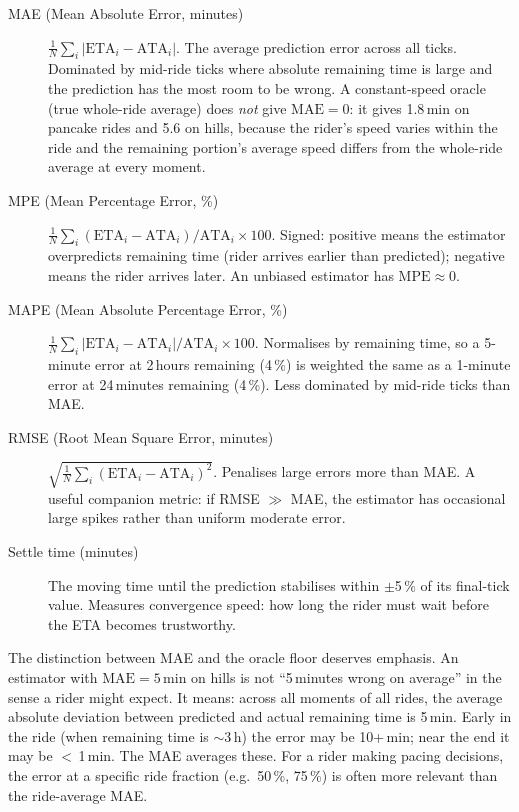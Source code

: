 \documentclass[11pt,a4paper]{article}
\begin{document}
\begin{description}
\item[MAE (Mean Absolute Error, minutes)]
  $\frac{1}{N}\sum_i |\text{ETA}_i - \text{ATA}_i|$.
  The average prediction error across all ticks. Dominated by
  mid-ride ticks where absolute remaining time is large and the
  prediction has the most room to be wrong. A constant-speed oracle
  (true whole-ride average) does \emph{not} give $\text{MAE} = 0$:
  it gives 1.8\,\si{\minute} on pancake rides and 5.6 on hills,
  because the rider's speed varies within the ride and the remaining
  portion's average speed differs from the whole-ride average at
  every moment.
\item[MPE (Mean Percentage Error, \%)]
  $\frac{1}{N}\sum_i (\text{ETA}_i - \text{ATA}_i) / \text{ATA}_i
  \times 100$. Signed: positive means the estimator overpredicts
  remaining time (rider arrives earlier than predicted); negative
  means the rider arrives later. An unbiased estimator has
  $\text{MPE} \approx 0$.
\item[MAPE (Mean Absolute Percentage Error, \%)]
  $\frac{1}{N}\sum_i |\text{ETA}_i - \text{ATA}_i| / \text{ATA}_i
  \times 100$. Normalises by remaining time, so a 5-minute error at
  2\,hours remaining (4\,\%) is weighted the same as a 1-minute error
  at 24\,minutes remaining (4\,\%). Less dominated by mid-ride ticks
  than MAE.
\item[RMSE (Root Mean Square Error, minutes)]
  $\sqrt{\frac{1}{N}\sum_i (\text{ETA}_i - \text{ATA}_i)^2}$.
  Penalises large errors more than MAE. A useful companion metric:
  if RMSE $\gg$ MAE, the estimator has occasional large spikes
  rather than uniform moderate error.
\item[Settle time (minutes)]
  The moving time until the prediction stabilises within
  $\pm$5\,\% of its final-tick value. Measures convergence speed:
  how long the rider must wait before the ETA becomes trustworthy.
\end{description}

The distinction between MAE and the oracle floor deserves emphasis.
An estimator with $\text{MAE} = 5$\,\si{\minute} on hills is not
``5\,minutes wrong on average'' in the sense a rider might expect.
It means: across all moments of all rides, the average absolute
deviation between predicted and actual remaining time is
5\,\si{\minute}. Early in the ride (when remaining time is
$\sim$3\,\si{\hour}) the error may be 10+\,\si{\minute}; near the
end it may be $<$\,1\,\si{\minute}. The MAE averages these. For a
rider making pacing decisions, the error at a specific ride fraction
(e.g.\ 50\,\%, 75\,\%) is often more relevant than the ride-average
MAE.
\end{document}

